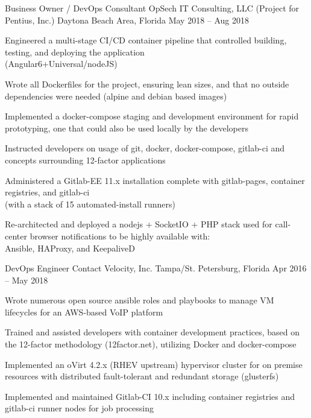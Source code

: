\begin{cventries}
	\cventry
	{Business Owner / DevOps Consultant}
	{OpSech IT Consulting, LLC (Project for Pentius, Inc.)}
	{Daytona Beach Area, Florida}
	{May 2018 – Aug 2018}
	{\begin{cvitems}
		\item Engineered a multi-stage CI/CD container pipeline that controlled building, testing, and deploying the application \\ (Angular6+Universal/nodeJS)
		\item Wrote all Dockerfiles for the project, ensuring lean sizes, and that no outside dependencies were needed (alpine and debian based images)
		\item Implemented a docker-compose staging and development environment for rapid prototyping, one that could also be used locally by the developers
		\item Instructed developers on usage of git, docker, docker-compose, gitlab-ci and concepts surrounding 12-factor applications
		\item Administered a Gitlab-EE 11.x installation complete with gitlab-pages, container registries, and gitlab-ci \\ (with a stack of 15 automated-install runners)
		\item Re-architected and deployed a nodejs + SocketIO + PHP stack used for call-center browser notifications to be highly available with: \\ Ansible, HAProxy, and KeepaliveD
		\end{cvitems}}
	\cventry
	{DevOps Engineer}
	{Contact Velocity, Inc.}
	{Tampa/St. Petersburg, Florida}
	{Apr 2016 – May 2018}
	{\begin{cvitems}
		\item {Wrote numerous open source ansible roles and playbooks to manage VM lifecycles for an AWS-based VoIP platform}
		\item {Trained and assisted developers with container development practices, based on the 12-factor methodology (12factor.net), utilizing Docker and docker-compose}
		\item {Implemented an oVirt 4.2.x (RHEV upstream) hypervisor cluster for on premise resources with distributed fault-tolerant and redundant storage (glusterfs)}
		\item {Implemented and maintained Gitlab-CI 10.x including container registries and gitlab-ci \textquotedbl{}runner\textquotedbl{} nodes for job processing}

\end{cvitems}}
\end{cventries}
